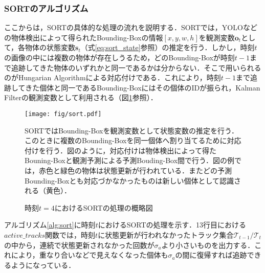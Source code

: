         \subsubsection{SORTのアルゴリズム}
        ここからは，SORTの具体的な処理の流れを説明する．SORTでは，YOLOなどの物体検出によって得られたBounding-Boxの情報$\left[x, y, w, h\right]$を観測変数$\bm{o}_t$として，各物体の状態変数$\bm{s}_t$（式\ref{eq:sort_state}参照）の推定を行う．しかし，時刻$t$の画像の中には複数の物体が存在しうるため，どのBounding-Boxが時刻$t-1$まで追跡してきた物体のいずれかと同一であるかは分からない．そこで用いられるのがHungarian Algorithmによる対応付けである．これにより，時刻$t-1$まで追跡してきた個体と同一であるBounding-Boxにはその個体のIDが振られ，Kalman Filterの観測変数として利用される（図\ref{fig:sort}参照）．

        \begin{figure}[t]
            \centering
            \texttt{[image: fig/sort.pdf]}
            \caption{時刻$t=4$におけるSORTの処理の概略図}
            \small
            SORTではBounding-Boxを観測変数として状態変数の推定を行う．このときに複数のBounding-Boxを同一個体へ割り当てるために対応付けを行う．図のように，対応付けは物体検出によって得たBouning-Boxと観測予測による予測Bouding-Box間で行う．図の例では，赤色と緑色の物体は状態更新が行われている．またどの予測Bounding-Boxとも対応づかなかったものは新しい個体として認識される（黄色）．
            \label{fig:sort}
        \end{figure}

        アルゴリズム\ref{alg:sort}に時刻$t$におけるSORTの処理を示す．13行目における$active\_tracks$関数では，時刻$t$に状態更新が行われなかったトラック集合$\mathcal{T}_{t-1}/\mathcal{T}_t$の中から，連続で状態更新されなかった回数が$\sigma_a$より小さいものを出力する．これにより，重なり合いなどで見えなくなった個体も$\sigma_a$の間に復帰すれば追跡できるようになっている．

